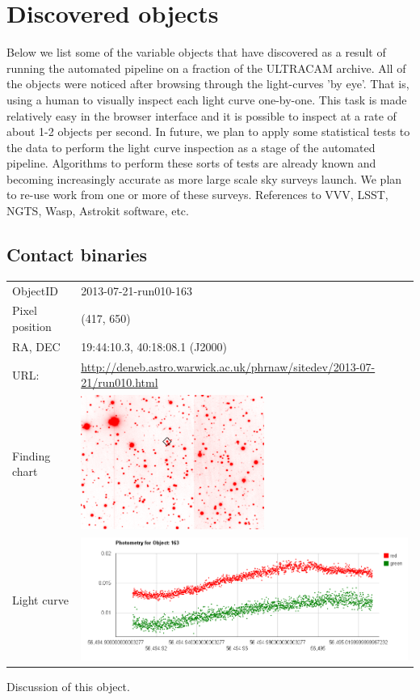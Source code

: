 \section{Discovered objects}

Below we list some of the variable objects that have discovered as a result of running the automated pipeline on a fraction of the ULTRACAM archive. All of the objects were noticed after browsing through the light-curves 'by eye'. That is, using a human to visually inspect each light curve one-by-one. This task is made relatively easy in the browser interface and it is possible to inspect at a rate of about 1-2 objects per second. In future, we plan to apply some statistical tests to the data to perform the light curve inspection as a stage of the automated pipeline. Algorithms to perform these sorts of tests are already known and becoming increasingly accurate as more large scale sky surveys launch. We plan to re-use work from one or more of these surveys. References to VVV, LSST, NGTS, Wasp, Astrokit software, etc.

\subsection{Contact binaries}

  \begin{tabular}{l l}
  \hline
  ObjectID & 2013-07-21-run010-163 \\
  Pixel position & (417, 650) \\
  RA, DEC & 19:44:10.3, 40:18:08.1 (J2000) \\
  URL: & \small \url{http://deneb.astro.warwick.ac.uk/phrnaw/sitedev/2013-07-21/run010.html} \\
  Finding chart & \includegraphics[width=60mm]{images/2013-07-21-run010-163.png} \\
  Light curve & \includegraphics[width=120mm]{images/2013-07-21-run010-163_lightcurve.png} \\
  \hline
  \end{tabular}
  Discussion of this object.

